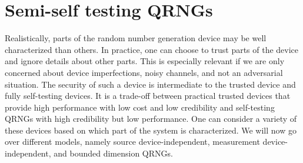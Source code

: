 \documentclass[]{interact}
\theoremstyle{plain}%
\theoremstyle{definition}
\theoremstyle{remark}
\begin{document}
\section{Semi-self testing QRNGs\label{sec:semi-selftesting}} 
Realistically, parts of the random number generation device may be well characterized than others. In practice, one can choose to trust parts of the device and ignore details about other parts. This is especially relevant if we are only concerned about device imperfections, noisy channels, and not an adversarial situation. The security of such a device is intermediate to the trusted device and fully self-testing devices. It is a trade-off between practical trusted devices that provide high performance with low cost and low credibility and self-testing QRNGs with high credibility but low performance. One can consider a variety of these devices based on which part of the system is characterized.  We will now go over different models, namely source device-independent, measurement device-independent, and bounded dimension QRNGs.
\end{document}
